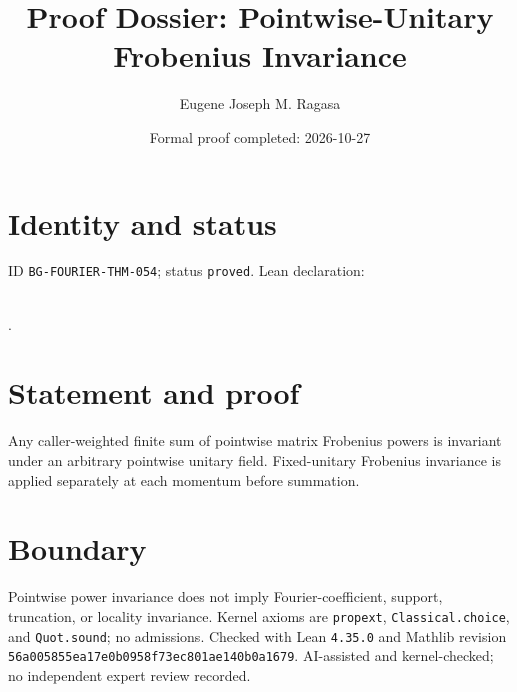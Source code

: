 \documentclass[11pt]{article}
\title{Proof Dossier: Pointwise-Unitary Frobenius Invariance}\author{Eugene Joseph M. Ragasa}\date{Formal proof completed: 2026-10-27}
\begin{document}
\maketitle
\section{Identity and status}
ID \texttt{BG-FOURIER-THM-054}; status \texttt{proved}. Lean declaration:
\par{}\\
{\tiny{}}.
\section{Statement and proof}
Any caller-weighted finite sum of pointwise matrix Frobenius powers is invariant under an
arbitrary pointwise unitary field. Fixed-unitary Frobenius invariance is applied separately
at each momentum before summation.
\section{Boundary}
Pointwise power invariance does not imply Fourier-coefficient, support, truncation, or
locality invariance. Kernel axioms are \texttt{propext}, \texttt{Classical.choice}, and
\texttt{Quot.sound}; no admissions. Checked with Lean \texttt{4.35.0} and Mathlib
revision \texttt{56a005855ea17e0b0958f73ec801ae140b0a1679}. AI-assisted and
kernel-checked; no independent expert review recorded.
\end{document}
